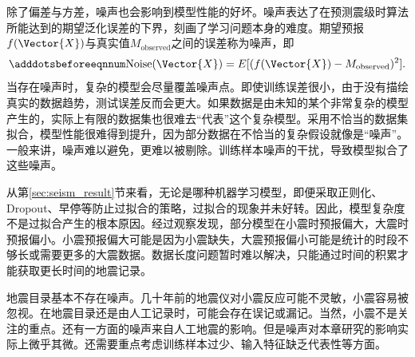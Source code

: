除了偏差与方差，噪声也会影响到模型性能的好坏。噪声表达了在预测震级时算法所能达到的期望泛化误差的下界，刻画了学习问题本身的难度。期望预报$f(\Vector{X})$与真实值$M_{\text{observed}}$之间的误差称为噪声，即
\begin{equation}\adddotsbeforeeqnnum
  \label{eq:seism_noise}
  \text{Noise}(\Vector{X})=E[(f(\Vector{X})-M_{\text{observed}})^2].
\end{equation}
当存在噪声时，复杂的模型会尽量覆盖噪声点。即使训练误差很小，由于没有描绘真实的数据趋势，测试误差反而会更大。如果数据是由未知的某个非常复杂的模型产生的，实际上有限的数据集也很难去“代表”这个复杂模型。采用不恰当的数据集拟合，模型性能很难得到提升，因为部分数据在不恰当的复杂假设就像是“噪声”。一般来讲，噪声难以避免，更难以被剔除。训练样本噪声的干扰，导致模型拟合了这些噪声。

从第\ref{sec:seism_result}节来看，无论是哪种机器学习模型，即便采取正则化、Dropout、早停等防止过拟合的策略，过拟合的现象并未好转。因此，模型复杂度不是过拟合产生的根本原因。经过观察发现，部分模型在小震时预报偏大，大震时预报偏小。小震预报偏大可能是因为小震缺失，大震预报偏小可能是统计的时段不够长或需要更多的大震数据。数据长度问题暂时难以解决，只能通过时间的积累才能获取更长时间的地震记录。

地震目录基本不存在噪声。几十年前的地震仪对小震反应可能不灵敏，小震容易被忽视。在地震目录还是由人工记录时，可能会存在误记或漏记。当然，小震不是关注的重点。还有一方面的噪声来自人工地震的影响。但是噪声对本章研究的影响实际上微乎其微。还需要重点考虑训练样本过少、输入特征缺乏代表性等方面。



































  
